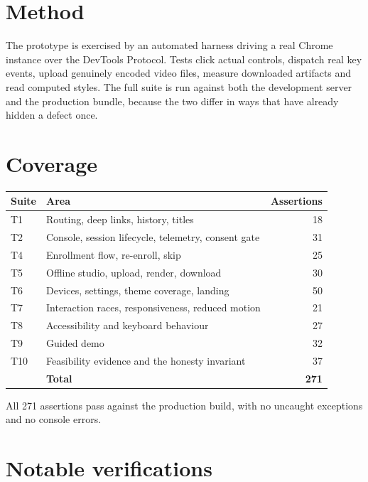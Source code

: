 \documentclass[11pt,a4paper]{report}
\begin{document}
\section{Method}

The prototype is exercised by an automated harness driving a real Chrome
instance over the DevTools Protocol. Tests click actual controls, dispatch real
key events, upload genuinely encoded video files, measure downloaded artifacts
and read computed styles. The full suite is run against both the development
server and the production bundle, because the two differ in ways that have
already hidden a defect once.

\section{Coverage}

\begin{center}
\begin{tabular}{llr}
\toprule
\textbf{Suite} & \textbf{Area} & \textbf{Assertions} \\
\midrule
T1 & Routing, deep links, history, titles & 18 \\
T2 & Console, session lifecycle, telemetry, consent gate & 31 \\
T4 & Enrollment flow, re-enroll, skip & 25 \\
T5 & Offline studio, upload, render, download & 30 \\
T6 & Devices, settings, theme coverage, landing & 50 \\
T7 & Interaction races, responsiveness, reduced motion & 21 \\
T8 & Accessibility and keyboard behaviour & 27 \\
T9 & Guided demo & 32 \\
T10 & Feasibility evidence and the honesty invariant & 37 \\
\midrule
& \textbf{Total} & \textbf{271} \\
\bottomrule
\end{tabular}
\end{center}

All 271 assertions pass against the production build, with no uncaught
exceptions and no console errors.

\section{Notable verifications}
\end{document}

